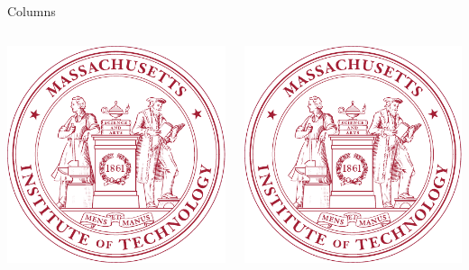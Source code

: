 \documentclass[red]{beamer}
\begin{document}
\begin{frame}{Columns}
\begin{columns}
\begin{column}[c]{0.4\textwidth}
\includegraphics[width=\textwidth]{mit}
\end{column}
\begin{column}[c]{0.4\textwidth}
\begin{block}{}
\includegraphics[width=\textwidth]{mit}
\end{block}
\end{column}
\end{columns}
\end{frame}
\end{document}
